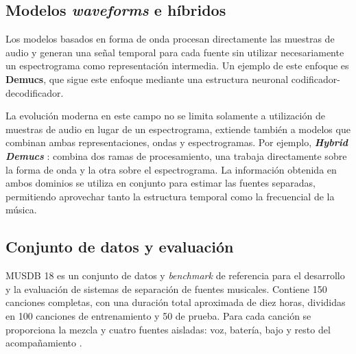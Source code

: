 \subsection{Modelos \textit{waveforms} e híbridos}

Los modelos basados en forma de onda procesan directamente las muestras de audio y generan una señal temporal para cada fuente sin utilizar necesariamente un espectrograma como representación intermedia. Un ejemplo de este enfoque es \textbf{Demucs}\cite{demucs}, que sigue este enfoque mediante una estructura neuronal codificador-decodificador.

La evolución moderna en este campo no se limita solamente a utilización de muestras de audio en lugar de un espectrograma, extiende también a modelos que combinan ambas representaciones, ondas y espectrogramas. Por ejemplo, \textbf{\textit{Hybrid Demucs}} \cite{HybridDemucs}: combina dos ramas de procesamiento, una trabaja directamente sobre la forma de onda y la otra sobre el espectrograma. La información obtenida en ambos dominios se utiliza en conjunto para estimar las fuentes separadas, permitiendo aprovechar tanto la estructura temporal como la frecuencial de la música.

\subsection{Conjunto de datos y evaluación}

MUSDB 18 es un conjunto de datos y \textit{benchmark} de referencia para el desarrollo y la evaluación de sistemas de separación de fuentes musicales. Contiene 150 canciones completas, con una duración total aproximada de diez horas, divididas en 100 canciones de entrenamiento y 50 de prueba. Para cada canción se proporciona la mezcla y cuatro fuentes aisladas: voz, batería, bajo y resto del acompañamiento \cite{musdb18}.